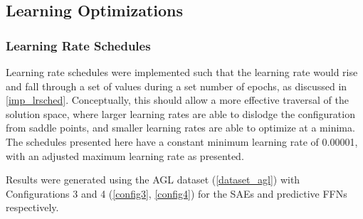 \documentclass[a4paper,11pt,oneside]{article}
\theoremstyle{plain}
\theoremstyle{definition}
\begin{document}
\subsection{Learning Optimizations}

\subsubsection{Learning Rate Schedules}

Learning rate schedules were implemented such that the learning rate would rise and fall through a set of values during a set number of epochs, as discussed in \ref{imp_lrsched}.	Conceptually, this should allow a more effective traversal of the solution space, where larger learning rates are able to dislodge the configuration from saddle points, and smaller learning rates are able to optimize at a minima. The schedules presented here have a constant minimum learning rate of 0.00001, with an adjusted maximum learning rate as presented. \newline

Results were generated using the AGL dataset (\ref{dataset_agl}) with Configurations 3 and 4 (\ref{config3}, \ref{config4}) for the SAEs and predictive FFNs respectively.
\end{document}
